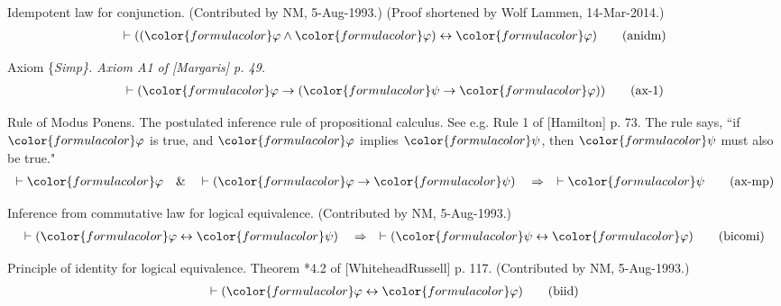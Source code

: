 \begin{lemma} Idempotent law for conjunction.  (Contributed
by NM, 5-Aug-1993.)  (Proof
     shortened by Wolf Lammen, 14-Mar-2014.)
\begin{align}
\vdash ( ( {\color{formulacolor}\varphi} \wedge {\color{formulacolor}\varphi} )
    \leftrightarrow {\color{formulacolor}\varphi} )\label{eq:anidm}\tag{anidm}
\end{align}
\end{lemma}


\begin{lemma} Axiom \{\em Simp\}.  Axiom A1 of [Margaris] p.
49.  
\begin{align}
\vdash ( {\color{formulacolor}\varphi} \rightarrow ( {\color{formulacolor}\psi}
    \rightarrow {\color{formulacolor}\varphi} ) )\label{eq:ax-1}\tag{ax-1}
\end{align}
\end{lemma}


\begin{lemma} Rule of Modus Ponens.  The postulated inference
rule of propositional
       calculus.  See e.g.  Rule 1 of [Hamilton] p. 73.  The rule says, ``if
       ${\color{formulacolor}\varphi}$ is true, and
${\color{formulacolor}\varphi}$ implies ${\color{formulacolor}\psi}$, then
${\color{formulacolor}\psi}$ must also be
       true."  
  \begin{align}
\vdash {\color{formulacolor}\varphi}\quad\&\quad \vdash (
    {\color{formulacolor}\varphi} \rightarrow {\color{formulacolor}\psi}
    )\quad\Rightarrow\quad \vdash {\color{formulacolor}\psi}\label{eq:ax-mp}\tag{ax-mp}
\end{align}
\end{lemma}


\begin{lemma} Inference from commutative law for logical
equivalence.  (Contributed by
       NM, 5-Aug-1993.)
\begin{align}
\vdash ( {\color{formulacolor}\varphi} \leftrightarrow
    {\color{formulacolor}\psi} )\quad\Rightarrow\quad \vdash (
    {\color{formulacolor}\psi} \leftrightarrow {\color{formulacolor}\varphi}
    )\label{eq:bicomi}\tag{bicomi}
\end{align}
\end{lemma}


\begin{lemma} Principle of identity for logical equivalence. 
Theorem *4.2 of
     [WhiteheadRussell] p. 117.  (Contributed by NM, 5-Aug-1993.)
\begin{align}
\vdash ( {\color{formulacolor}\varphi} \leftrightarrow
    {\color{formulacolor}\varphi} )\label{eq:biid}\tag{biid}
\end{align}
\end{lemma}


